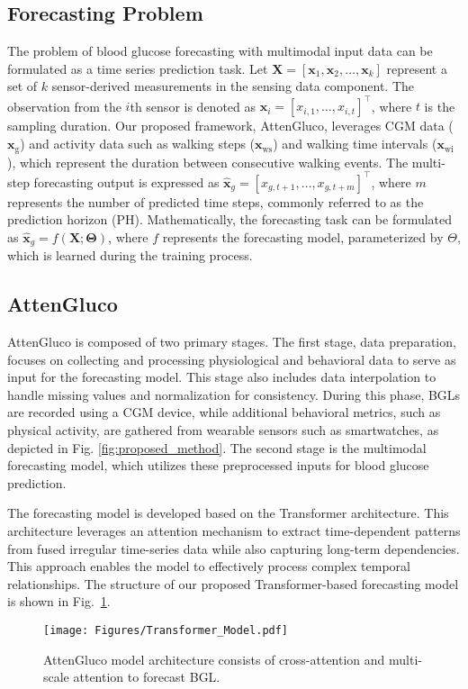 \subsection{Forecasting Problem}
The problem of blood glucose forecasting with multimodal input data can be formulated as a time series prediction task. Let \( \mathbf{X} = [\mathbf{x}_1, \mathbf{x}_2, \dots, \mathbf{x}_k] \) represent a set of \( k \) sensor-derived measurements in the sensing data component. The observation from the \( i\)th sensor is denoted as \( \mathbf{x}_i = [x_{i,1}, \dots, x_{i,t}]^\top \), where $t$ is the sampling duration. Our proposed framework, AttenGluco, leverages CGM data ($\mathbf{x}_{\text{g}}$) and activity data such as walking steps ($\mathbf{x}_{\text{ws}}$) and walking time intervals ($\mathbf{x}_{\text{wi}}$), which represent the duration between consecutive walking events. The multi-step forecasting output is expressed as $ \mathbf{\hat{x}}_g = [x_{g,t+1}, \dots, x_{g,t+m}]^\top $, where $m$ represents the number of predicted time steps, commonly referred to as the prediction horizon (PH). Mathematically, the forecasting task can be formulated as $\mathbf{\hat{x}}_g = f(\mathbf{X; \Theta})$, where \( f \) represents the forecasting model, parameterized by \( \Theta \), which is learned during the training process.


\subsection{AttenGluco}

AttenGluco is composed of two primary stages. The first stage, data preparation, focuses on collecting and processing physiological and behavioral data to serve as input for the forecasting model. This stage also includes data interpolation to handle missing values and normalization for consistency. During this phase, BGLs are recorded using a CGM device, while additional behavioral metrics, such as physical activity, are gathered from wearable sensors such as smartwatches, as depicted in Fig. \ref{fig:proposed_method}. The second stage is the multimodal forecasting model, which utilizes these preprocessed inputs for blood glucose prediction.

The forecasting model is developed based on the Transformer architecture. This architecture leverages an attention mechanism to extract time-dependent patterns from fused irregular time-series data while also capturing long-term dependencies. This approach enables the model to effectively process complex temporal relationships. The structure of our proposed Transformer-based forecasting model is shown in Fig.~\ref{fig:transformer_method}.
\begin{figure}[t]
    \centering
    \texttt{[image: Figures/Transformer\_Model.pdf]}
    \caption{\small AttenGluco model architecture consists of cross-attention and multi-scale attention to forecast BGL.}
    \label{fig:transformer_method}
\end{figure}

